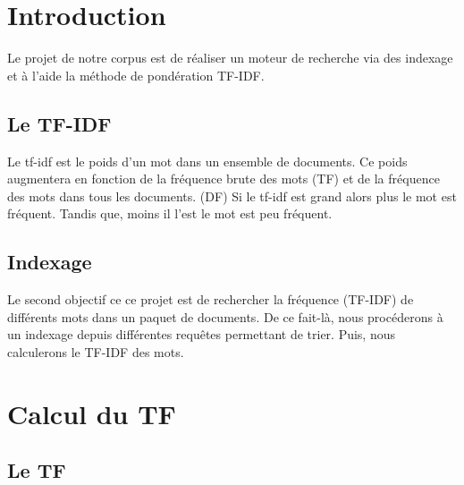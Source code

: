 \documentclass{article}
\begin{document}

\tableofcontents
\newpage

\section{Introduction}

Le projet de notre corpus est de réaliser un moteur de recherche via des indexage et à l'aide la méthode de pondération TF-IDF.



\subsection{Le TF-IDF}

Le tf-idf est le poids d'un mot dans un ensemble de documents. Ce poids augmentera en fonction de la fréquence brute des mots (TF) et de la fréquence des mots dans tous les documents. (DF)
Si le tf-idf est grand alors plus le mot est fréquent. Tandis que, moins il l'est le mot est peu fréquent.

\subsection{Indexage}

Le second objectif ce ce projet est de rechercher la fréquence (TF-IDF) de différents mots dans un paquet de documents. De ce fait-là, nous procéderons à un indexage depuis différentes requêtes permettant de trier. Puis, nous calculerons le TF-IDF des mots.

\section{Calcul du TF}

\subsection{Le TF}
\end{document}
